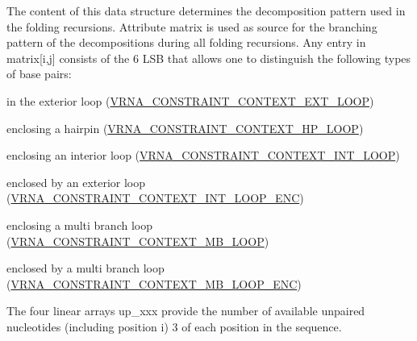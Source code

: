The content of this data structure determines the decomposition pattern used in the folding recursions. Attribute \textquotesingle{}matrix\textquotesingle{} is used as source for the branching pattern of the decompositions during all folding recursions. Any entry in matrix\mbox{[}i,j\mbox{]} consists of the 6 L\+SB that allows one to distinguish the following types of base pairs\+:
\begin{DoxyItemize}
\item in the exterior loop (\mbox{\hyperlink{group__hard__constraints_ga9418eda62a5dec070896702c279d2548}{V\+R\+N\+A\+\_\+\+C\+O\+N\+S\+T\+R\+A\+I\+N\+T\+\_\+\+C\+O\+N\+T\+E\+X\+T\+\_\+\+E\+X\+T\+\_\+\+L\+O\+OP}})
\item enclosing a hairpin (\mbox{\hyperlink{group__hard__constraints_ga79203702b197b6b9d3b78eed40663eb1}{V\+R\+N\+A\+\_\+\+C\+O\+N\+S\+T\+R\+A\+I\+N\+T\+\_\+\+C\+O\+N\+T\+E\+X\+T\+\_\+\+H\+P\+\_\+\+L\+O\+OP}})
\item enclosing an interior loop (\mbox{\hyperlink{group__hard__constraints_ga21feeab3a9e5fa5a9e3d9ac0fcf5994f}{V\+R\+N\+A\+\_\+\+C\+O\+N\+S\+T\+R\+A\+I\+N\+T\+\_\+\+C\+O\+N\+T\+E\+X\+T\+\_\+\+I\+N\+T\+\_\+\+L\+O\+OP}})
\item enclosed by an exterior loop (\mbox{\hyperlink{group__hard__constraints_ga0536288e04ff6332ecdc23ca4705402b}{V\+R\+N\+A\+\_\+\+C\+O\+N\+S\+T\+R\+A\+I\+N\+T\+\_\+\+C\+O\+N\+T\+E\+X\+T\+\_\+\+I\+N\+T\+\_\+\+L\+O\+O\+P\+\_\+\+E\+NC}})
\item enclosing a multi branch loop (\mbox{\hyperlink{group__hard__constraints_ga456ecd2ff00056bb64da8dd4f61bbfc5}{V\+R\+N\+A\+\_\+\+C\+O\+N\+S\+T\+R\+A\+I\+N\+T\+\_\+\+C\+O\+N\+T\+E\+X\+T\+\_\+\+M\+B\+\_\+\+L\+O\+OP}})
\item enclosed by a multi branch loop (\mbox{\hyperlink{group__hard__constraints_ga02a3d703ddbcfce393e4bbfcb9db7077}{V\+R\+N\+A\+\_\+\+C\+O\+N\+S\+T\+R\+A\+I\+N\+T\+\_\+\+C\+O\+N\+T\+E\+X\+T\+\_\+\+M\+B\+\_\+\+L\+O\+O\+P\+\_\+\+E\+NC}})
\end{DoxyItemize}

The four linear arrays \textquotesingle{}up\+\_\+xxx\textquotesingle{} provide the number of available unpaired nucleotides (including position i) 3\textquotesingle{} of each position in the sequence.

